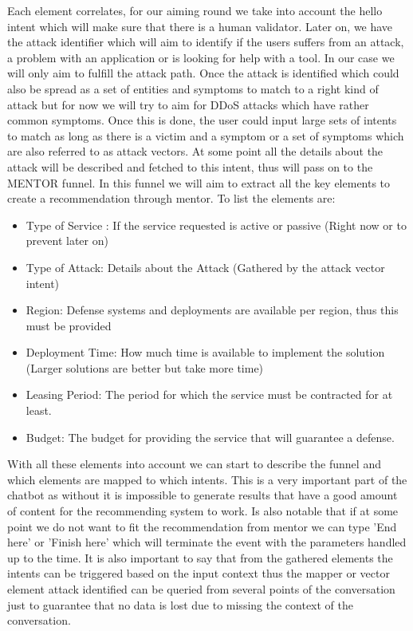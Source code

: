 Each element correlates, for our aiming round we take into account the hello intent which will make sure that there is a human validator. Later on, we have the attack identifier which will aim to identify if the users suffers from an attack, a problem with an application or is looking for help with a tool. In our case we will only aim to fulfill the attack path. Once the attack is identified which could also be spread as a set of entities and symptoms to match to a right kind of attack but for now we will try to aim for DDoS attacks which have rather common symptoms. Once this is done, the user could input large sets of intents to match as long as there is a victim and a symptom or a set of symptoms which are also referred to as attack vectors. At some point all the details about the attack will be described and fetched to this intent, thus will pass on to the MENTOR \cite{MENTOR} funnel. In this funnel we will aim to extract all the key elements to create a recommendation through mentor. To list the elements are:

\begin{itemize}
    \item Type of Service : If the service requested is active or passive (Right now or to prevent later on)
    
    \item Type of Attack: Details about the Attack (Gathered by the attack vector intent)
    
    \item Region: Defense systems and deployments are available per region, thus this must be provided
    
    \item Deployment Time: How much time is available to implement the solution (Larger solutions are better but take more time)
    
    \item Leasing Period: The period for which the service must be contracted for at least.
    
    \item Budget: The budget for providing the service that will guarantee a defense.
\end{itemize}

With all these elements into account we can start to describe the funnel and which elements are mapped to which intents. This is a very important part of the chatbot as without it is impossible to generate results that have a good amount of content for the recommending system to work. Is also notable that if at some point we do not want to fit the recommendation from mentor we can type 'End here' or 'Finish here' which will terminate the event with the parameters handled up to the time. It is also important to say that from the gathered elements the intents can be triggered based on the input context thus the mapper or vector element attack identified can be queried from several points of the conversation just to guarantee that no data is lost due to missing the context of the conversation.

